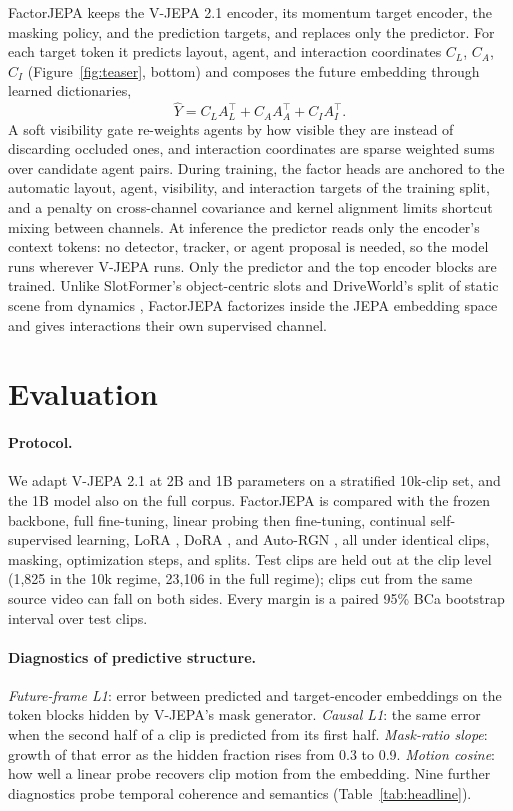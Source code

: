 \documentclass[letterpaper]{article} %
\begin{document}
FactorJEPA keeps the V-JEPA 2.1 encoder, its momentum target encoder, the masking policy, and the prediction targets, and replaces only the predictor. For each target token it predicts layout, agent, and interaction coordinates $C_L$, $C_A$, $C_I$ (Figure~\ref{fig:teaser}, bottom) and composes the future embedding through learned dictionaries,
\begin{equation}
\widehat Y = C_L A_L^{\top} + C_A A_A^{\top} + C_I A_I^{\top}.
\end{equation}
A soft visibility gate re-weights agents by how visible they are instead of discarding occluded ones, and interaction coordinates are sparse weighted sums over candidate agent pairs. During training, the factor heads are anchored to the automatic layout, agent, visibility, and interaction targets of the training split, and a penalty on cross-channel covariance and kernel alignment limits shortcut mixing between channels. At inference the predictor reads only the encoder's context tokens: no detector, tracker, or agent proposal is needed, so the model runs wherever V-JEPA runs. Only the predictor and the top encoder blocks are trained. Unlike SlotFormer's object-centric slots \cite{wu2023slotformer} and DriveWorld's split of static scene from dynamics \cite{min2024driveworld}, FactorJEPA factorizes inside the JEPA embedding space and gives interactions their own supervised channel.

\section{Evaluation}

\paragraph{Protocol.}
We adapt V-JEPA 2.1 at 2B and 1B parameters on a stratified 10k-clip set, and the 1B model also on the full corpus. FactorJEPA is compared with the frozen backbone, full fine-tuning, linear probing then fine-tuning, continual self-supervised learning, LoRA \cite{hu2022lora}, DoRA \cite{liu2024dora}, and Auto-RGN \cite{lee2023surgical}, all under identical clips, masking, optimization steps, and splits. Test clips are held out at the clip level (1,825 in the 10k regime, 23,106 in the full regime); clips cut from the same source video can fall on both sides. Every margin is a paired 95\% BCa bootstrap interval over test clips.

\paragraph{Diagnostics of predictive structure.}
\emph{Future-frame L1}: error between predicted and target-encoder embeddings on the token blocks hidden by V-JEPA's mask generator. \emph{Causal L1}: the same error when the second half of a clip is predicted from its first half. \emph{Mask-ratio slope}: growth of that error as the hidden fraction rises from 0.3 to 0.9. \emph{Motion cosine}: how well a linear probe recovers clip motion from the embedding. Nine further diagnostics probe temporal coherence and semantics (Table~\ref{tab:headline}).
\end{document}
